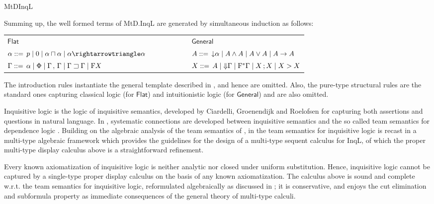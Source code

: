 \begin{entry}{MtDInqL}
\begin{clarifications}
Summing up, the well formed terms of MtD.InqL are generated by simultaneous induction as follows: 
\begin{center}
\setlength{\tabcolsep}{0.4em}
\begin{tabular}{lcl}
$\mathsf{Flat}$ & \ \ \ \ \ \ \ \ \ & $\mathsf{General}$\\
$\alpha ::= \,p \mid 0 \mid \alpha \cand \alpha \mid \alpha \cra \alpha$ & & $A ::= \,{\downarrow} \alpha \mid A \wedge A \mid A \vee A \mid A \to A$ \\
$\Gamma ::= \,\alpha \mid \Phi \mid \Gamma \,,\, \Gamma \mid \Gamma \sqsupset \Gamma\mid \mathrm{F} X$ & & $X ::= \,A\mid{\Downarrow} \Gamma\mid \mathrm{F}^*\Gamma \mid X \,; X \mid X > X$ \\
\end{tabular}
\end{center}

The introduction rules instantiate the general template described in , and hence are omitted. Also, the pure-type structural rules are the standard ones capturing classical logic (for $\mathsf{Flat}$) and intuitionistic logic (for $\mathsf{General}$) and are also omitted. 
\end{clarifications}


\begin{history}
Inquisitive logic is the logic of inquisitive semantics, developed by Ciardelli, Groenendijk and Roelofsen \cite{GroenendijkRoelofsen2009,CiardelliRoelofsen2011} for capturing both assertions and questions in natural language. In \cite{Yang2014}, systematic connections are developed between inquisitive semantics and the so called team semantics for dependence logic \cite{AbramskyVaananen2009}. Building on the algebraic analysis of the team semantics of \cite{AbramskyVaananen2009}, in  
 \cite{FrittellaGrecoPalmigianoYang2016}  the team semantics for inquisitive logic is recast in a multi-type algebraic framework which provides the guidelines for the design of a multi-type sequent calculus for InqL, of which the proper multi-type display calculus  above is a straightforward refinement. 
\end{history}

\begin{technicalities}
Every known axiomatization of inquisitive logic is neither analytic nor closed under uniform substitution. Hence, inquisitive logic cannot be captured by a single-type proper display calculus on the basis of any known axiomatization. The calculus above is sound and complete w.r.t. the team semantics for inquisitive logic, reformulated algebraically as discussed in \cite{FrittellaGrecoPalmigianoYang2016}; it is conservative, and enjoys the cut elimination and subformula property as immediate consequences of the general theory of multi-type calculi. 
\end{technicalities}

\end{entry}
